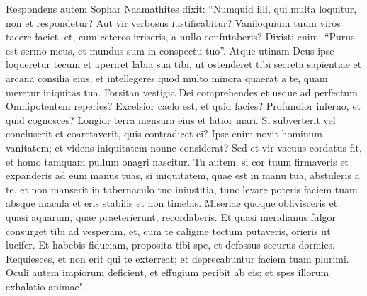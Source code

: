 \begin{biblechapter}  
\verse Respondens autem Sophar Naamathites dixit: 
\verse “Numquid illi, qui multa loquitur, non et respondetur? Aut vir verbosus iustificabitur? 
\verse Vaniloquium tuum viros tacere faciet, et, cum ceteros irriseris, a nullo confutaberis? 
\verse Dixisti enim: “Purus est sermo meus, et mundus sum in conspectu tuo”. 
\verse Atque utinam Deus ipse loqueretur tecum et aperiret labia sua tibi, 
\verse ut ostenderet tibi secreta sapientiae et arcana consilia eius, et intellegeres quod multo minora quaerat a te, quam meretur iniquitas tua. 
\verse Forsitan vestigia Dei comprehendes et usque ad perfectum Omnipotentem reperies? 
\verse Excelsior caelo est, et quid facies? Profundior inferno, et quid cognosces? 
\verse Longior terra mensura eius et latior mari. 
\verse Si subverterit vel concluserit et coarctaverit, quis contradicet ei? 
\verse Ipse enim novit hominum vanitatem; et videns iniquitatem nonne considerat? 
\verse Sed et vir vacuus cordatus fit, et homo tamquam pullum onagri nascitur. 
\verse Tu autem, si cor tuum firmaveris et expanderis ad eum manus tuas, 
\verse si iniquitatem, quae est in manu tua, abstuleris a te, et non manserit in tabernaculo tuo iniustitia, 
\verse tunc levare poteris faciem tuam absque macula et eris stabilis et non timebis. 
\verse Miseriae quoque oblivisceris et quasi aquarum, quae praeterierunt, recordaberis. 
\verse Et quasi meridianus fulgor consurget tibi ad vesperam, et, cum te caligine tectum putaveris, orieris ut lucifer. 
\verse Et habebis fiduciam, proposita tibi spe, et defossus securus dormies. 
\verse Requiesces, et non erit qui te exterreat; et deprecabuntur faciem tuam plurimi. 
\verse Oculi autem impiorum deficient, et effugium peribit ab eis; et spes illorum exhalatio animae". 
\end{biblechapter}

